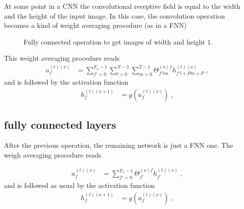 At some point in a CNN the convolutional receptive field is equal to the width and the height of the input image. In this case, the convolution operation becomes a kind of weight averaging procedure (as in a FNN)


\begin{figure}[H]
\begin{center}
\caption{Fully connected operation to get images of width and height $1$.}
\end{center}
\end{figure}

This weight averaging procedure reads
\begin{align}
a_{f}^{(t)(\nu)}&=\sum^{F_\nu-1}_{f'=0}\sum^{N-1}_{l=0}
%
\sum^{T-1}_{m=0}\Theta^{(o)f}_{f'lm}h^{(t)(\nu)}_{f'l+Pm+P}\;,
\end{align}
and is followed by the activation function
\begin{align}
h_{f}^{(t)(\nu+1)}&=g\left(a_{f}^{(t)(\nu)}\right)\;,
\end{align}
\subsection{fully connected layers}

After the previous operation, the remaining network is just a FNN one. The weigh averaging procedure reads

\begin{align}
a_{f}^{(t)(\nu)}&=\sum^{F_\nu-1}_{f'=0}\Theta^{(o)f}_{f'}h^{(t)(\nu)}_{f'}\;,
\end{align}
and is followed as usual by the activation function
 \begin{align}
h_{f}^{(t)(\nu+1)}&=g\left(a_{f}^{(t)(\nu)}\right)\;,
\end{align}

